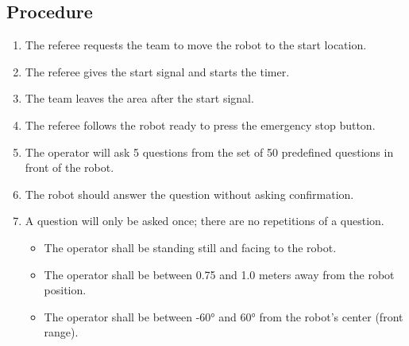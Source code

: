 \subsection*{Procedure}
	\begin{enumerate}[nosep]
		\item The referee requests the team to move the robot to the start location.
		\item The referee gives the start signal and starts the timer.
		\item The team leaves the area after the start signal.		
		\item The referee follows the robot ready to press the emergency stop button.
		
		\item The operator will ask 5 questions from the set of 50 predefined questions in front of the robot.
		\item The robot should answer the question without asking confirmation.
		\item A question will only be asked once; there are no repetitions of a question.
		\begin{itemize}
		    \item The operator shall be standing still and facing to the robot.
		    \item The operator shall be between 0.75 and 1.0 meters away from the robot position.
    		\item The operator shall be between -60° and 60° from the robot’s center (front range).
		\end{itemize}
	\end{enumerate}

